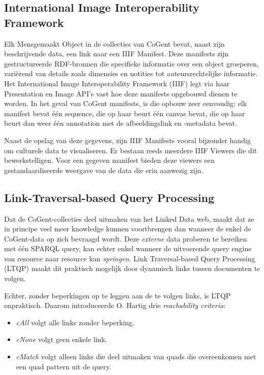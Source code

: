 \documentclass[conference]{IEEEtran}
\begin{document}
\subsection{International Image Interoperability Framework}
Elk Mensgemaakt Object in de collecties van CoGent bevat, naast zijn beschrijvende data, een link naar een IIIF Manifest. Deze manifests zijn gestructureerde RDF-bronnen die specifieke informatie over een object groeperen, variërend van details zoals dimensies en notities tot auteursrechtelijke informatie. Het International Image Interoperability Framework (IIIF) legt via haar Presentation en Image API's vast hoe deze manifests opgebouwd dienen te worden. In het geval van CoGent manifests, is die opbouw zeer eenvoudig: elk manifest bevat één sequence, die op haar beurt één canvas bevat, die op haar beurt dan weer één annotation met de afbeeldingslink en -metadata bevat. \cite{appleby2017presentation} \cite{emanuel2018stitching} \cite{floreverk2022coghent}

Naast de opslag van deze gegevens, zijn IIIF Manifests vooral bijzonder handig om culturele data te visualiseren. Er bestaan reeds meerdere IIIF Viewers die dit bewerkstelligen. Voor een gegeven manifest bieden deze viewers een gestandaardiseerde weergave van de data die erin aanwezig zijn. \cite{snydman2015international}

\subsection{Link-Traversal-based Query Processing}
Dat de CoGent-collecties deel uitmaken van het Linked Data web, maakt dat ze in principe veel meer knowledge kunnen voortbrengen dan wanneer de enkel de CoGent-data op zich bevraagd wordt. Deze \textit{externe} data proberen te bereiken met één SPARQL query, kan echter enkel wanneer de uitvoerende query engine van resource naar resource kan \textit{springen}. Link Traversal-based Query Processing (LTQP) maakt dit praktisch mogelijk door dynamisch links tussen documenten te volgen. \cite{taelman2023ltqp}

Echter, zonder beperkingen op te leggen aan de te volgen links, is LTQP onpraktisch. Daarom introduceerde O. Hartig \cite{hartig2012foundations} drie \textit{reachability criteria}: 
\begin{itemize}
    \item \textit{cAll} volgt alle links zonder beperking.
    \item \textit{cNone} volgt geen enkele link.
    \item \textit{cMatch} volgt alleen links die deel uitmaken van quads die overeenkomen met een quad pattern uit de query.
\end{itemize}
\end{document}
